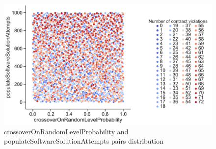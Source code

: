 \begin{figure}
	\centering
	\includegraphics[width=\textwidth]{images/PairsDistr/crossoverOnRandomLevelProbability_populateSoftwareSolutionAttempts.pdf}
	\caption[]{crossoverOnRandomLevelProbability and populateSoftwareSolutionAttempts pairs distribution}
	\label{fig:crossoverOnRandomLevelProbability_populateSoftwareSolutionAttempts_pair}
\end{figure}